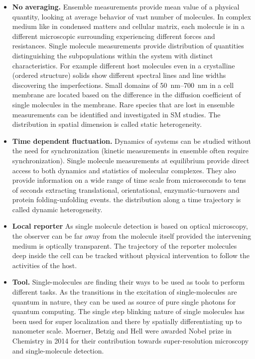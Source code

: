 \begin{itemize}
	\item \textbf{No averaging.} Ensemble measurements provide mean value of a physical quantity, looking at average behavior of vast number of molecules.
	In complex medium like in condensed matters and cellular matrix, each molecule is in a different microscopic surrounding experiencing different forces and resistances.
	Single molecule measurements provide distribution of quantities distinguishing the subpopulations within the system with distinct characteristics.
	For example different host molecules even in a crystalline (ordered structure) solids show different spectral lines and line widths discovering the imperfections.\cite{kozankiewicz1994single,reilly1993spectral}
	Small domains of \SIrange{50}{700}{\nm} in a cell membrane are located based on the difference in the diffusion coefficient of single molecules in the membrane.\cite{lommerse2004singlemolecule}
	Rare species that are lost in ensemble measurements can be identified and investigated in SM studies.
	The distribution in spatial dimension is called static heterogeneity.
	\item \textbf{Time dependent fluctuation.} Dynamics of systems can be studied without the need for synchronization (kinetic measurements in ensemble often require synchronization).
	Single molecule measurements at equilibrium provide direct access to both dynamics and statistics of molecular complexes.
	They also provide information on a wide range of time scale from microseconds to tens of seconds extracting translational, orientational, enzymatic-turnovers and protein folding-unfolding events.\cite{schmidt1996imaging,ruiter1997single,lu1998singlemolecule,schuler2002probing}
	the distribution along a time trajectory is called dynamic heterogeneity.
	\item \textbf{Local reporter} As single molecule detection is based on optical microscopy, the observer can be far away from the molecule itself provided the intervening medium is optically transparent.
	The trajectory of the reporter molecules deep inside the cell can be tracked without physical intervention to follow the activities of the host.
	\item \textbf{Tool.} Single-molecules are finding their ways to be used as tools to perform different tasks.
	As the transitions in the excitation of single-molecules are quantum in nature, they can be used as source of pure single photons for quantum computing.\cite{lounis2000single,lounis2005singlephoton}
	The single step blinking nature of single molecules has been used for super localization and there by spatially differentiating up to nanometer scale.\cite{park2003superresolution,huang2008threedimensional}
	Moerner, Betzig and Hell were awarded Nobel prize in Chemistry in 2014 for their contribution towards super-resolution microscopy and single-molecule detection.
\end{itemize}


